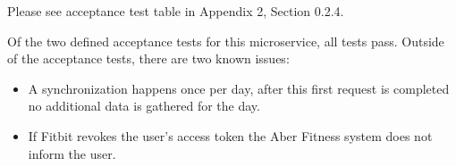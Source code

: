 

Please see acceptance test table in Appendix 2, Section 0.2.4. 

Of the two defined acceptance tests for this microservice, all tests pass. Outside of the acceptance tests, there are two known issues:

\begin{itemize}
    \item A synchronization happens once per day, after this first request is completed no additional data is gathered for the day.
    \item If Fitbit revokes the user's access token the Aber Fitness system does not inform the user.
\end{itemize}